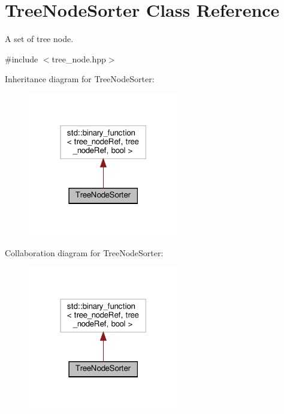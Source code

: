 \hypertarget{classTreeNodeSorter}{}\section{Tree\+Node\+Sorter Class Reference}
\label{classTreeNodeSorter}


A set of tree node.  




{\ttfamily \#include $<$tree\+\_\+node.\+hpp$>$}



Inheritance diagram for Tree\+Node\+Sorter\+:
\nopagebreak
\begin{figure}[H]
\begin{center}
\leavevmode
\includegraphics[width=187pt]{da/dd8/classTreeNodeSorter__inherit__graph}
\end{center}
\end{figure}


Collaboration diagram for Tree\+Node\+Sorter\+:
\nopagebreak
\begin{figure}[H]
\begin{center}
\leavevmode
\includegraphics[width=187pt]{d6/d1c/classTreeNodeSorter__coll__graph}
\end{center}
\end{figure}
